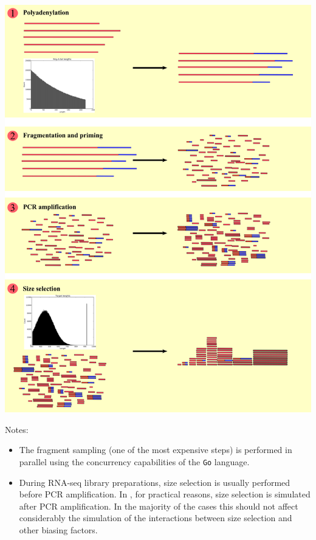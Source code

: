 \begin{enumerate}
\begin{center}
\includegraphics[scale=0.36]{pix/rlsim_main.png}
\end{center}

Notes:

\begin{itemize}
\item The fragment sampling (one of the most expensive steps) is performed in parallel using the concurrency capabilities of the {\tt Go} language. 
\item During RNA-seq library preparations, size selection is usually performed before PCR amplification. In \rlsim, for practical reasons, size selection is simulated after PCR amplification. In the majority of the cases this should not affect considerably the simulation of the interactions between size selection and other biasing factors.
\end{itemize}

\end{enumerate}

